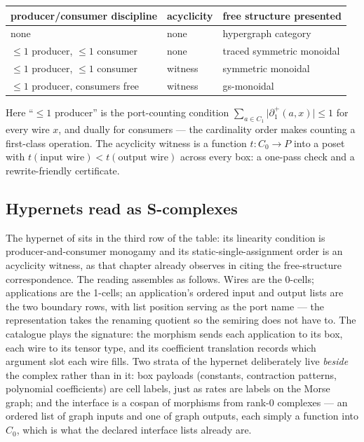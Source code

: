 \begin{center}
\begin{tabular}{@{}lll@{}}
\toprule
producer/consumer discipline & acyclicity & free structure presented \\
\midrule
none & none & hypergraph category \cite{bonchi20} \\
$\le 1$ producer, $\le 1$ consumer & none & traced symmetric monoidal \cite{kissinger13} \\
$\le 1$ producer, $\le 1$ consumer & witness & symmetric monoidal \cite{bonchi22} \\
$\le 1$ producer, consumers free & witness & gs-monoidal \cite{fritzliang22} \\
\bottomrule
\end{tabular}
\end{center}

Here ``$\le 1$ producer'' is the port-counting condition
$\sum_{a \in C_1} \lvert \partial_1^{+}(a, x) \rvert \le 1$ for every
wire $x$, and dually for consumers --- the cardinality order makes
counting a first-class operation. The acyclicity witness is a
function $t \colon C_0 \to P$ into a poset with
$t(\text{input wire}) < t(\text{output wire})$ across every box: a
one-pass check and a rewrite-friendly certificate.

\subsection{Hypernets read as S-complexes}
\label{sec:scx-hypernets}

The hypernet of 
sits in the third row of the table: its linearity condition is
producer-and-consumer monogamy and its static-single-assignment
order is an acyclicity witness, as that chapter already observes in
citing the free-structure correspondence. The reading assembles as
follows. Wires are the 0-cells; applications are the 1-cells; an
application's ordered input and output lists are the two boundary
rows, with list position serving as the port name --- the
representation takes the renaming quotient so the semiring does not
have to. The catalogue plays the signature: the morphism sends each
application to its box, each wire to its tensor type, and its
coefficient translation records which argument slot each wire fills.
Two strata of the hypernet deliberately live \emph{beside} the
complex rather than in it: box payloads (constants, contraction
patterns, polynomial coefficients) are cell labels, just as rates
are labels on the Morse graph; and the interface is a cospan of
morphisms from rank-0 complexes --- an ordered list of graph inputs
and one of graph outputs, each simply a function into $C_0$, which
is what the declared interface lists already are.

